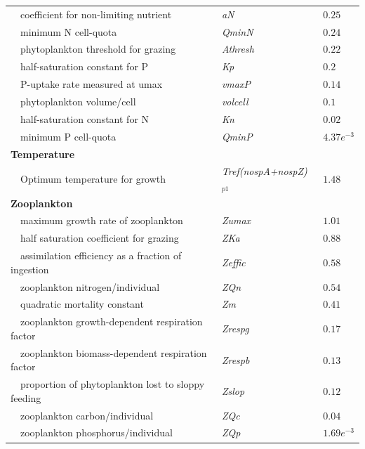 \documentclass[review]{elsarticle}\usepackage[]{graphicx}\usepackage[]{color}
\begin{document}
\begin{table}[!tbp]
{\begin{center}
\begin{tabular}{lll}
~~coefficient for non-limiting nutrient&\textit{aN}&$0.25$\tabularnewline
~~minimum N cell-quota&\textit{QminN}&$0.24$\tabularnewline
~~phytoplankton threshold for grazing&\textit{Athresh}&$0.22$\tabularnewline
~~half-saturation constant for P&\textit{Kp}&$0.2$\tabularnewline
~~P-uptake rate measured at umax&\textit{vmaxP}&$0.14$\tabularnewline
~~phytoplankton volume/cell&\textit{volcell}&$0.1$\tabularnewline
~~half-saturation constant for N&\textit{Kn}&$0.02$\tabularnewline
~~minimum P cell-quota&\textit{QminP}&$4.37e^{-3}$\tabularnewline
\hline
{\bfseries Temperature}&&\tabularnewline
~~Optimum temperature for growth&\textit{Tref(nospA+nospZ)$_{p1}$}&$1.48$\tabularnewline
\hline
{\bfseries Zooplankton}&&\tabularnewline
~~maximum growth rate of zooplankton&\textit{Zumax}&$1.01$\tabularnewline
~~half saturation coefficient for grazing&\textit{ZKa}&$0.88$\tabularnewline
~~assimilation efficiency as a fraction of ingestion&\textit{Zeffic}&$0.58$\tabularnewline
~~zooplankton nitrogen/individual&\textit{ZQn}&$0.54$\tabularnewline
~~quadratic mortality constant&\textit{Zm}&$0.41$\tabularnewline
~~zooplankton growth-dependent respiration factor&\textit{Zrespg}&$0.17$\tabularnewline
~~zooplankton biomass-dependent respiration factor&\textit{Zrespb}&$0.13$\tabularnewline
~~proportion of phytoplankton lost to sloppy feeding&\textit{Zslop}&$0.12$\tabularnewline
~~zooplankton carbon/individual&\textit{ZQc}&$0.04$\tabularnewline
~~zooplankton phosphorus/individual&\textit{ZQp}&$1.69e^{-3}$\tabularnewline
\hline
\end{tabular}\end{center}}
\end{table}
\end{document}
